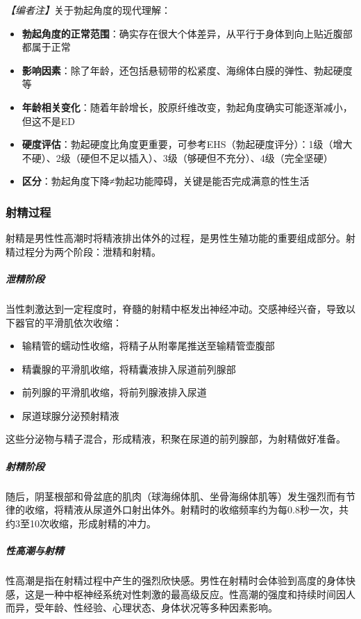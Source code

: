 \noindent\textit{【编者注】}关于勃起角度的现代理解：
\begin{itemize}
	\item \textbf{勃起角度的正常范围}：确实存在很大个体差异，从平行于身体到向上贴近腹部都属于正常
	\item \textbf{影响因素}：除了年龄，还包括悬韧带的松紧度、海绵体白膜的弹性、勃起硬度等
	\item \textbf{年龄相关变化}：随着年龄增长，胶原纤维改变，勃起角度确实可能逐渐减小，但这不是ED
	\item \textbf{硬度评估}：勃起硬度比角度更重要，可参考EHS（勃起硬度评分）：1级（增大不硬）、2级（硬但不足以插入）、3级（够硬但不充分）、4级（完全坚硬）
	\item \textbf{区分}：勃起角度下降≠勃起功能障碍，关键是能否完成满意的性生活
\end{itemize}

\subsubsection{射精过程}

射精是男性性高潮时将精液排出体外的过程，是男性生殖功能的重要组成部分。射精过程分为两个阶段：泄精和射精。

\subparagraph{泄精阶段}

当性刺激达到一定程度时，脊髓的射精中枢发出神经冲动。交感神经兴奋，导致以下器官的平滑肌依次收缩：
\begin{itemize}
    \item 输精管的蠕动性收缩，将精子从附睾尾推送至输精管壶腹部
    \item 精囊腺的平滑肌收缩，将精囊液排入尿道前列腺部
    \item 前列腺的平滑肌收缩，将前列腺液排入尿道
    \item 尿道球腺分泌预射精液
\end{itemize}
这些分泌物与精子混合，形成精液，积聚在尿道的前列腺部，为射精做好准备。

\subparagraph{射精阶段}

随后，阴茎根部和骨盆底的肌肉（球海绵体肌、坐骨海绵体肌等）发生强烈而有节律的收缩，将精液从尿道外口射出体外。射精时的收缩频率约为每0.8秒一次，共约3至10次收缩，形成射精的冲力。

\subparagraph{性高潮与射精}

性高潮是指在射精过程中产生的强烈欣快感。男性在射精时会体验到高度的身体快感，这是一种中枢神经系统对性刺激的最高级反应。性高潮的强度和持续时间因人而异，受年龄、性经验、心理状态、身体状况等多种因素影响。

